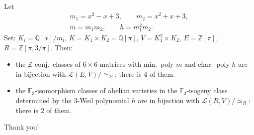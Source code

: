 \documentclass[aspectratio=169,handout,usenames,dvipsnames]{beamer}
\def\Q{\mathbb{Q}}
\def\Z{\mathbb{Z}}
\def\F{\mathbb{F}}
\newcommand{\cL}{{\mathcal L}}
\begin{document}
\begin{frame}{}\
   \begin{example}
      Let
      \vspace*{-2em}
      \begin{gather*}
         m_1 =x^2 - x + 3, \qquad
         m_2 = x^2 + x + 3,\\
         m = m_1m_2, \qquad h =m_1^2m_2.
      \end{gather*}
      \pause
      Set: $K_i=\Q[x]/m_i$, $K=K_1\times K_2=\Q[\pi]$, $V=K_1^2\times K_2$, $E=\Z[\pi]$, $R=\Z[\pi,3/\pi]$.
      \pause
      Then:
      \begin{itemize}
            \item the $\Z$-conj.~classes of $6\times 6$-matrices with min.~poly $m$ and char.~poly $h$ are in bijection with $\cL(E,V)/\simeq_E$: there is $4$ of them.
      \pause
            \item the $\F_3$-isomorphism classes of abelian varieties in the $\F_3$-isogeny class determined by the $3$-Weil polynomial $h$ are in bijection with $\cL(R,V)/\simeq_R$: there is $2$ of them.
      \end{itemize}
   \end{example}
   \vspace*{1em}
   \pause
   \begin{center}
      {\Huge Thank you!}
   \end{center}
\end{frame}

\end{document}
